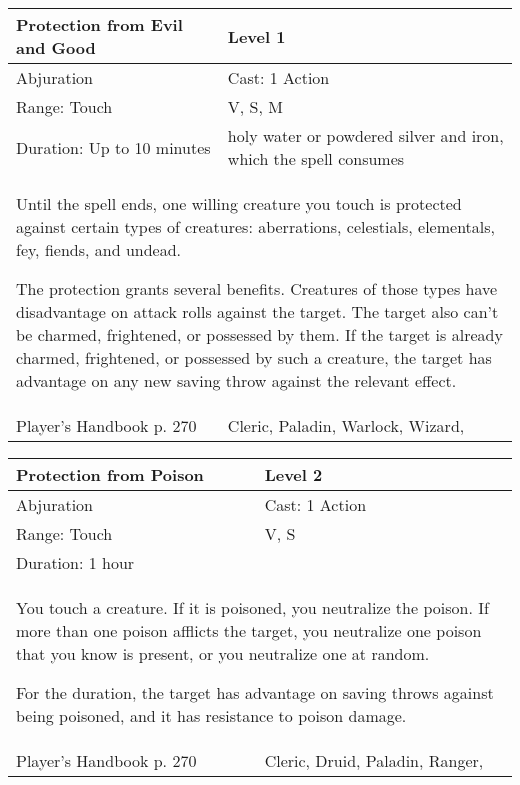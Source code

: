 \documentclass[11pt]{report}
\begin{document}
\begin{table}[H]
	\begin{tabular}{||p{6cm}|p{6cm}||}
		\hline\hline
		\bf{Protection from Evil and Good} & Level 1\\ \hline
		Abjuration & Cast: 1 Action\\ \hline
		Range: Touch & V, S, M\\ \hline
		Duration: Up to 10 minutes & holy water or powdered silver and iron, which the spell consumes\\ \hline
		\multicolumn{2}{||p{12cm}||}{Until the spell ends, one willing creature you touch is protected against certain types of creatures: aberrations, celestials, elementals, fey, fiends, and undead.

The protection grants several benefits. Creatures of those types have disadvantage on attack rolls against the target. The target also can’t be charmed, frightened, or possessed by them. If the target is already charmed, frightened, or possessed by such a creature, the target has advantage on any new saving throw against the relevant effect.}\\ \hline
Player's Handbook p. 270 & Cleric, Paladin, Warlock, Wizard, \\ \hline\hline
	\end{tabular}
\end{table}

\begin{table}[H]
	\begin{tabular}{||p{6cm}|p{6cm}||}
		\hline\hline
		\bf{Protection from Poison} & Level 2\\ \hline
		Abjuration & Cast: 1 Action\\ \hline
		Range: Touch & V, S\\ \hline
		Duration: 1 hour & \\ \hline
		\multicolumn{2}{||p{12cm}||}{You touch a creature. If it is poisoned, you neutralize the poison. If more than one poison afflicts the target, you neutralize one poison that you know is present, or you neutralize one at random.

For the duration, the target has advantage on saving throws against being poisoned, and it has resistance to poison damage.}\\ \hline
Player's Handbook p. 270 & Cleric, Druid, Paladin, Ranger, \\ \hline\hline
	\end{tabular}
\end{table}
\end{document}
